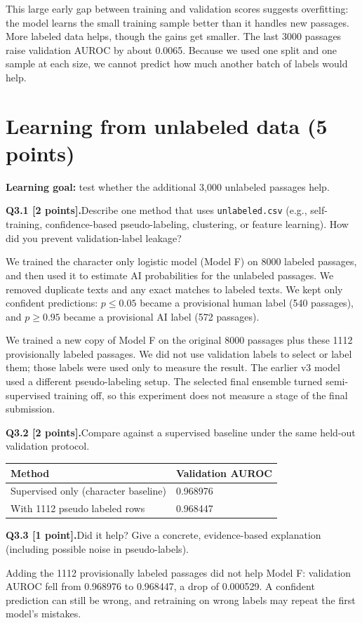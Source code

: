 \documentclass[11pt,letterpaper]{article}
\newcommand{\question}[2]{\needspace{4\baselineskip}\par\addvspace{0.45em}\noindent\textbf{#1}\quad #2\par\nobreak\vspace{0.1em}}
\begin{document}
This large early gap between training and validation scores suggests overfitting: the model learns the small training sample better than it handles new passages. More labeled data helps, though the gains get smaller. The last 3000 passages raise validation AUROC by about 0.0065. Because we used one split and one sample at each size, we cannot predict how much another batch of labels would help.
\section{Learning from unlabeled data (5 points)}
\textbf{Learning goal:} test whether the additional 3,000 unlabeled passages help.
\question{Q3.1 [2 points].}{Describe one method that uses \texttt{unlabeled.csv} (e.g., self-training, confidence-based pseudo-labeling, clustering, or feature learning). How did you prevent validation-label leakage?}
We trained the character only logistic model (Model F) on 8000 labeled passages, and then used it to estimate AI probabilities for the unlabeled passages. We removed duplicate texts and any exact matches to labeled texts. We kept only confident predictions: $p\leq0.05$ became a provisional human label (540 passages), and $p\geq0.95$ became a provisional AI label (572 passages).

We trained a new copy of Model F on the original 8000 passages plus these 1112 provisionally labeled passages. We did not use validation labels to select or label them; those labels were used only to measure the result. The earlier v3 model used a different pseudo-labeling setup. The selected final ensemble turned semi-supervised training off, so this experiment does not measure a stage of the final submission.
\question{Q3.2 [2 points].}{Compare against a supervised baseline under the same held-out validation protocol.}
\begin{tabularx}{\linewidth}{@{}Yp{1.5in}@{}}\toprule Method & Validation AUROC \\ \midrule Supervised only (character baseline) & 0.968976 \\ With 1112 pseudo labeled rows & 0.968447 \\ \bottomrule\end{tabularx}
\question{Q3.3 [1 point].}{Did it help? Give a concrete, evidence-based explanation (including possible noise in pseudo-labels).}
Adding the 1112 provisionally labeled passages did not help Model F: validation AUROC fell from 0.968976 to 0.968447, a drop of 0.000529. A confident prediction can still be wrong, and retraining on wrong labels may repeat the first model's mistakes.
\end{document}
